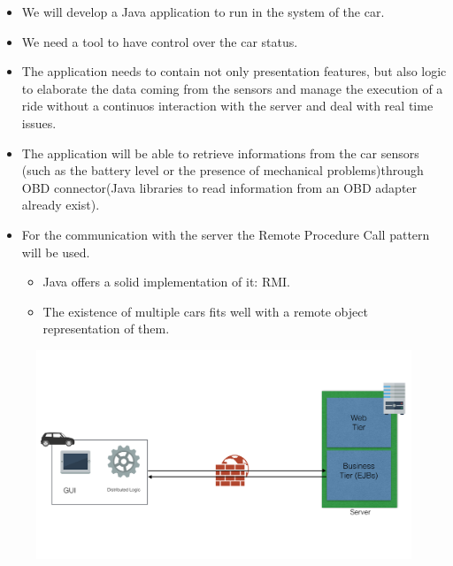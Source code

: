 \documentclass[]{article}
\providecommand{\tightlist}{%
  \setlength{\itemsep}{0pt}\setlength{\parskip}{0pt}}
\begin{document}
\begin{itemize}
\item
  We will develop a Java application to run in the system of the car.
\item
  We need a tool to have control over the car status.
\item
  The application needs to contain not only presentation features, but
  also logic to elaborate the data coming from the sensors and manage
  the execution of a ride without a continuos interaction with the
  server and deal with real time issues.
\item
  The application will be able to retrieve informations from the car
  sensors (such as the battery level or the presence of mechanical
  problems)through OBD connector(Java libraries to read information from
  an OBD adapter already exist).
\item
  For the communication with the server the Remote Procedure Call
  pattern will be used.

  \begin{itemize}
  \tightlist
  \item
    Java offers a solid implementation of it: RMI.
  \item
    The existence of multiple cars fits well with a remote object
    representation of them.
  \end{itemize}
\end{itemize}

\begin{figure}
\centering
\includegraphics[width=1.00000\textwidth,height=1.00000\textwidth]{./images/carAppArch.png}
\caption{}\label{id}
\end{figure}
\end{document}
